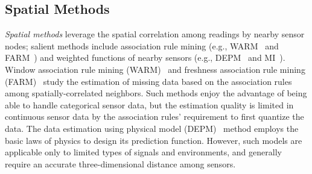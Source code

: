 \subsection{Spatial Methods}\label{subsec:sm}
{\em Spatial methods} leverage the spatial correlation among readings
by nearby sensor nodes; salient methods include association rule
mining (e.g., WARM~\cite{le2005estimating} and
FARM~\cite{Gruenwald:FARM}) 
and weighted functions of nearby sensors (e.g., DEPM~\cite{li2008data}
and MI~\cite{yuan2000multiple}).
Window association rule mining (WARM)~\cite{le2005estimating} and freshness association rule mining (FARM)~\cite{Gruenwald:FARM} study the estimation of missing data based on the association rules among spatially-correlated neighbors. 
Such methods enjoy the advantage of being able to handle categorical sensor data, but the 
estimation quality is limited in continuous sensor data by the association rules' requirement to 
first quantize the data.
The data estimation using physical model (DEPM)~\cite{li2008data} method employs the basic laws of physics to 
design its prediction function. %
However, such models are applicable only to limited types of signals and environments, and generally require 
an accurate three-dimensional distance among sensors.

